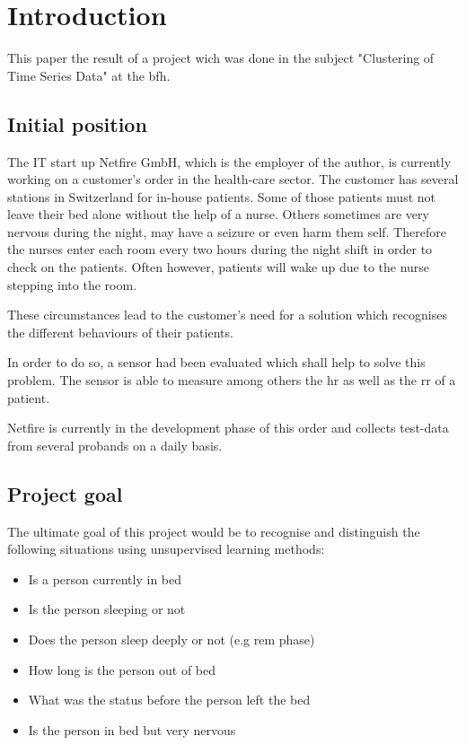 \chapter{Introduction}

This paper the result of a project wich was done in the subject "Clustering of Time Series Data" at the \ac{bfh}.


\section{Initial position}

The IT start up Netfire GmbH, which is the employer of the author, is currently working on a customer's order in the health-care sector. The customer has several stations in Switzerland for in-house patients. Some of those patients must not leave their bed alone without the help of a nurse. Others sometimes are very nervous during the night, may have a seizure or even harm them self.
Therefore the nurses enter each room every two hours during the night shift in order to check on the patients. Often however, patients will wake up due to the nurse stepping into the room.

These circumstances lead to the customer's need for a solution which recognises the different behaviours of their patients.

In order to do so, a sensor had been evaluated which shall help to solve this problem. The sensor is able to measure among others the \ac{hr} as well as the \ac{rr} of a patient.


Netfire is currently in the development phase of this order and collects test-data from several probands on a daily basis.

\clearpage
\section{Project goal}

The ultimate goal of this project would be to recognise and distinguish the following situations using unsupervised learning methods:

\begin{itemize}
  \item Is a person currently in bed
  \item Is the person sleeping or not
  \item Does the person sleep deeply or not (e.g \ac{rem} phase)
  \item How long is the person out of bed
  \item What was the status before the person left the bed
  \item Is the person in bed but very nervous
\end{itemize}

